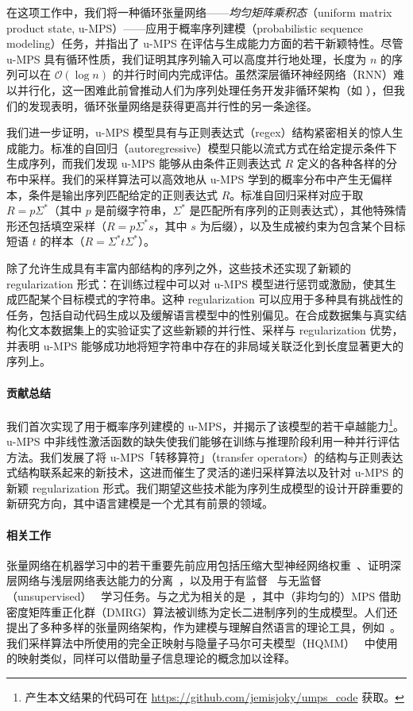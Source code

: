 \documentclass[twoside]{article}
\newcommand{\bigO}{\mc{O}}
\newcommand{\mc}[1]{\mathcal{#1}}
\begin{document}
在这项工作中，我们将一种循环张量网络——\emph{均匀矩阵乘积态}（uniform matrix product state, u-MPS）——应用于概率序列建模（probabilistic sequence modeling）任务，并指出了 u-MPS 在评估与生成能力方面的若干新颖特性。尽管 u-MPS 具有循环性质，我们证明其序列输入可以高度并行地处理，长度为 $n$ 的序列可以在 $\bigO(\log n)$ 的并行时间内完成评估。虽然深层循环神经网络（RNN）难以并行化，这一困难此前曾推动人们为序列处理任务开发非循环架构（如 \citep{gehring2017, vaswani2017}），但我们的发现表明，循环张量网络是获得更高并行性的另一条途径。

我们进一步证明，u-MPS 模型具有与正则表达式（regex）结构紧密相关的惊人生成能力。标准的自回归（autoregressive）模型只能以流式方式在给定提示条件下生成序列，而我们发现 u-MPS 能够从由条件正则表达式 $R$ 定义的各种各样的分布中采样。我们的采样算法可以高效地从 u-MPS 学到的概率分布中产生无偏样本，条件是输出序列匹配给定的正则表达式 $R$。标准自回归采样对应于取 $R = p\Sigma^*$（其中 $p$ 是前缀字符串，$\Sigma^*$ 是匹配所有序列的正则表达式），其他特殊情形还包括填空采样（$R = p\Sigma^*s$，其中 $s$ 为后缀），以及生成被约束为包含某个目标短语 $t$ 的样本（$R=\Sigma^*t\Sigma^*$）。

除了允许生成具有丰富内部结构的序列之外，这些技术还实现了新颖的 regularization 形式：在训练过程中可以对 u-MPS 模型进行惩罚或激励，使其生成匹配某个目标模式的字符串。这种 regularization 可以应用于多种具有挑战性的任务，包括自动代码生成以及缓解语言模型中的性别偏见。在合成数据集与真实结构化文本数据集上的实验证实了这些新颖的并行性、采样与 regularization 优势，并表明 u-MPS 能够成功地将短字符串中存在的非局域关联泛化到长度显著更大的序列上。

\paragraph{贡献总结}
我们首次实现了用于概率序列建模的 u-MPS，并揭示了该模型的若干卓越能力\footnote{产生本文结果的代码可在 \url{https://github.com/jemisjoky/umps_code} 获取。}。u-MPS 中非线性激活函数的缺失使我们能够在训练与推理阶段利用一种并行评估方法。我们发展了将 u-MPS「转移算符」（transfer operators）的结构与正则表达式结构联系起来的新技术，这进而催生了灵活的递归采样算法以及针对 u-MPS 的新颖 regularization 形式。我们期望这些技术能为序列生成模型的设计开辟重要的新研究方向，其中语言建模是一个尤其有前景的领域。

\paragraph{相关工作}
张量网络在机器学习中的若干重要先前应用包括压缩大型神经网络权重~\citep{novikov2015}、证明深层网络与浅层网络表达能力的分离~\citep{cohen2016}，以及用于有监督~\citep{stoudenmire2016, novikov2017, glasser2018} 与无监督（unsupervised）~\citep{han2018, stoudenmire2018, cheng2019} 学习任务。与之尤为相关的是~\citep{stokes2019}，其中（非均匀的）MPS 借助密度矩阵重正化群（DMRG）算法被训练为定长二进制序列的生成模型。人们还提出了多种多样的张量网络架构，作为建模与理解自然语言的理论工具，例如~\citep{pestun2017, coecke2010, gallego2017, degiuli2019}。我们采样算法中所使用的完全正映射与隐量子马尔可夫模型（HQMM）~\citep{monras2010,srinivasan2018} 中使用的映射类似，同样可以借助量子信息理论的概念加以诠释。
\end{document}
